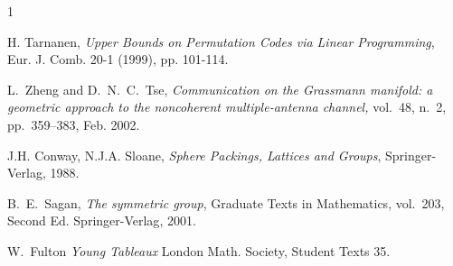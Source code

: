 \documentclass[10pt]{article}
\begin{document}
\begin{thebibliography}{1}

H. Tarnanen,
\emph{Upper Bounds on Permutation Codes via Linear Programming},
Eur. J. Comb. 20-1 (1999), pp. 101-114.

 

L.~Zheng and D.~N.~C.~Tse, \emph{Communication on the Grassmann
manifold: a geometric approach to the noncoherent multiple-antenna
channel,} vol.~48, n.~2, pp.~359–383, Feb. 2002.


 J.H. Conway, N.J.A. Sloane, 
{\em Sphere Packings, Lattices and Groups}, 
Springer-Verlag, 1988.



 {B.~E.~Sagan},
 \emph{The symmetric group},
 {Graduate Texts in Mathematics},
 vol.~{203}, {Second Ed.} {Springer-Verlag}, {2001}.



 {W.~Fulton}
 \emph{Young Tableaux}
 {London Math. Society},
 Student Texts 35.




\end{thebibliography}
\end{document}
